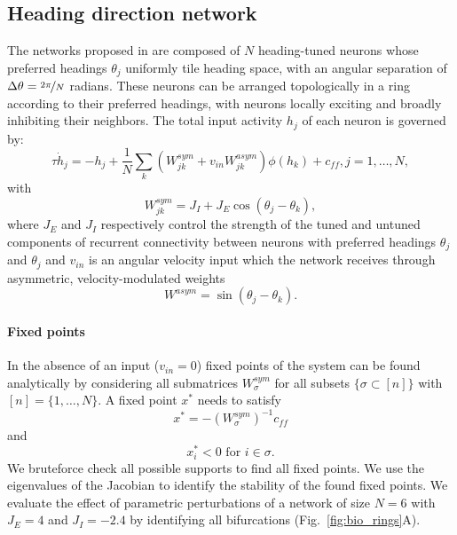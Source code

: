 \documentclass{article} %
\newcounter{ct}
\theoremstyle{definition}
\theoremstyle{remark}
\begin{document}
\subsection{Heading direction network}\label{sec:supp:headdirection}
The networks proposed in \citep{noorman2024accurate} are composed of \(N\) heading-tuned neurons whose preferred headings \(\theta_{j}\) uniformly tile heading space, with an angular separation of \(\Delta\theta=\nicefrac{2\pi}{N}\) radians.
These neurons can be arranged topologically in a ring according to their preferred headings, with neurons locally exciting and broadly inhibiting their neighbors.
The total input activity \(h_{j}\) of each neuron is governed by:
\begin{equation}
\tau \dot h_{j} = -h_{j} + \frac{1}{N} \sum_{k} (W_{jk}^{sym} + v_{in} W_{jk}^{asym})\phi(h_{k})+c_{ff},     j = 1,\dots, N,
\end{equation}
with
\begin{equation}
W_{jk}^{sym} = J_{I} + J_{E} \cos(\theta_{j} - \theta_{k}),
\end{equation} where \(J_{E}\) and \(J_{I}\) respectively control the strength of the tuned and untuned components of recurrent connectivity between neurons with preferred headings \(\theta_{j}\) and \(\theta_{j}\)
and \(v_{in}\) is an angular velocity input which the network receives through asymmetric, velocity-modulated weights \begin{equation}W^{asym} =\sin(\theta_{j} - \theta_{k}).\end{equation}
\paragraph{Fixed points}
In the absence of an input (\(v_{in}=0\)) fixed points of the system can be found analytically by considering all submatrices \(W_{\sigma}^{sym}\) for all subsets \(\{\sigma\subset [n]\}\) with\([n]=\{1,\dots, N\}\).
A fixed point \(x^*\) needs to satisfy
\begin{equation}
x^*= -(W_{\sigma}^{sym})^{-1}c_{ff}
\end{equation}and
\begin{equation}
x^*_{i}<0 \text{   for  	 } i\in\sigma.
\end{equation}
We bruteforce check all possible supports to find all fixed points.
We use the eigenvalues of the Jacobian to identify the stability of the found fixed points.
We evaluate the effect of parametric perturbations of a network of size \(N = 6\) with \(J_{E} = 4\) and \(J_{I}=-2.4\) by identifying all bifurcations (Fig.~\ref{fig:bio_rings}A).
\end{document}
